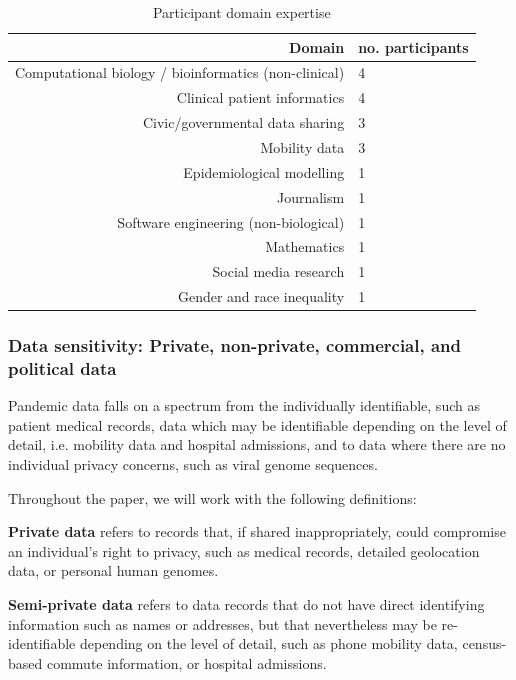 \documentclass{CUP-JNL-DAP}%
\begin{document}
\begin{table}[h!]
  \begin{center}
    \caption{Participant domain expertise}
    \label{tab:professions}
    \begin{tabular}{r|l} %
      \textbf{Domain} & \textbf{no. participants} \\
      \hline
      Computational biology / bioinformatics (non-clinical)  & 4\\
      Clinical patient informatics & 4\\
      Civic/governmental data sharing & 3 \\
      Mobility data & 3\\
      Epidemiological modelling & 1\\
      Journalism & 1\\
      Software engineering (non-biological) & 1\\
      Mathematics & 1\\      
      Social media research & 1\\      
      Gender and race inequality & 1\\      
    \end{tabular}
  \end{center}
\end{table}

\subsubsection{Data sensitivity: Private, non-private, commercial, and political data}

Pandemic data falls on a spectrum from the individually identifiable, such as patient medical records, data which may be identifiable depending on the level of detail, i.e. mobility data and hospital admissions, and to data where there are no individual privacy concerns, such as viral genome sequences.  

Throughout the paper, we will work with the following definitions: 

\textbf{Private data} refers to records that, if shared inappropriately, could compromise an individual's right to privacy, such as medical records, detailed geolocation data, or personal human genomes. 

\textbf{Semi-private data} refers to data records that do not have direct identifying information such as names or addresses, but that nevertheless may be re-identifiable depending on the level of detail, such as phone mobility data, census-based commute information, or hospital admissions.
\end{document}

